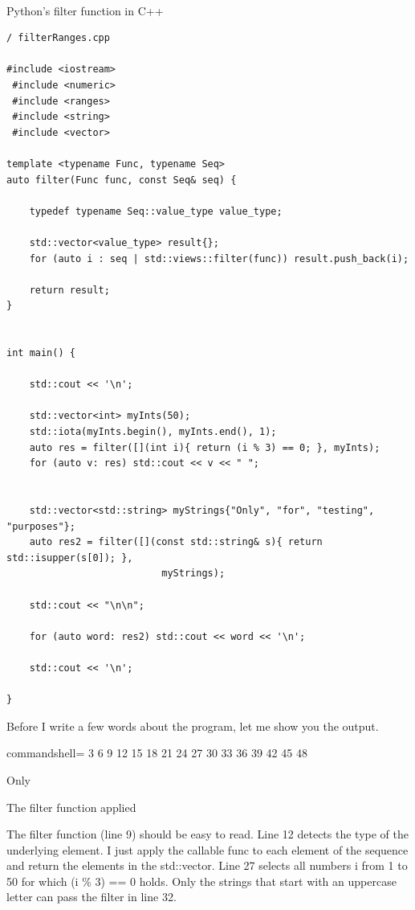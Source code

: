 \hspace*{\fill} \\ %
\noindent
Python’s filter function in C++
\begin{lstlisting}[style=styleCXX]
/ filterRanges.cpp

#include <iostream>
 #include <numeric>
 #include <ranges>
 #include <string>
 #include <vector>

template <typename Func, typename Seq>
auto filter(Func func, const Seq& seq) {

	typedef typename Seq::value_type value_type;
	
	std::vector<value_type> result{};
	for (auto i : seq | std::views::filter(func)) result.push_back(i);
	
	return result;
}


int main() {
	
	std::cout << '\n';
	
	std::vector<int> myInts(50);
	std::iota(myInts.begin(), myInts.end(), 1);
	auto res = filter([](int i){ return (i % 3) == 0; }, myInts);
	for (auto v: res) std::cout << v << " ";
	
	
	std::vector<std::string> myStrings{"Only", "for", "testing", "purposes"};
	auto res2 = filter([](const std::string& s){ return std::isupper(s[0]); },
	                       myStrings);
	
	std::cout << "\n\n";
	
	for (auto word: res2) std::cout << word << '\n';
	
	std::cout << '\n';

}
\end{lstlisting}

Before I write a few words about the program, let me show you the output.

\begin{tcblisting}{commandshell={}}
3 6 9 12 15 18 21 24 27 30 33 36 39 42 45 48

Only
\end{tcblisting}

\begin{center}
The filter function applied
\end{center}

The filter function (line 9) should be easy to read. Line 12 detects the type of the underlying element. I just apply the callable func to each element of the sequence and return the elements in the std::vector. Line 27 selects all numbers i from 1 to 50 for which (i \% 3) == 0 holds. Only the strings that start with an uppercase letter can pass the filter in line 32.

